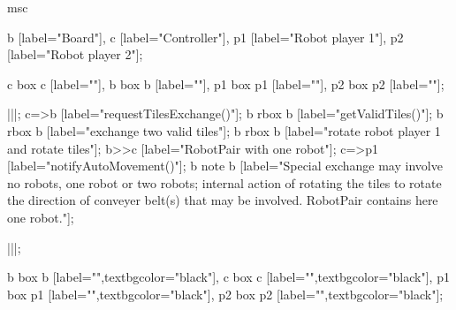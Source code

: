 \begin{msc}
msc
{

b [label="Board"],
c [label="Controller"],
p1 [label="Robot player 1"],
p2 [label="Robot player 2"];

c box c [label=""],
b box b [label=""],
p1 box p1 [label=""],
p2 box p2 [label=""];

|||;
c=>b [label="requestTilesExchange()"];
b rbox b [label="getValidTiles()"];
b rbox b [label="exchange two valid tiles"];
b rbox b [label="rotate robot player 1 and rotate tiles"];
b>>c [label="RobotPair with one robot"];
c=>p1 [label="notifyAutoMovement()"];
b note b [label="Special exchange may involve no robots, one robot or two robots; internal action of rotating the tiles to rotate the direction of conveyer belt(s) that may be involved. RobotPair contains here one robot."];

|||;

b box b [label="",textbgcolor="black"],
c box c [label="",textbgcolor="black"],
p1 box p1 [label="",textbgcolor="black"],
p2 box p2 [label="",textbgcolor="black"];

}
\end{msc}

